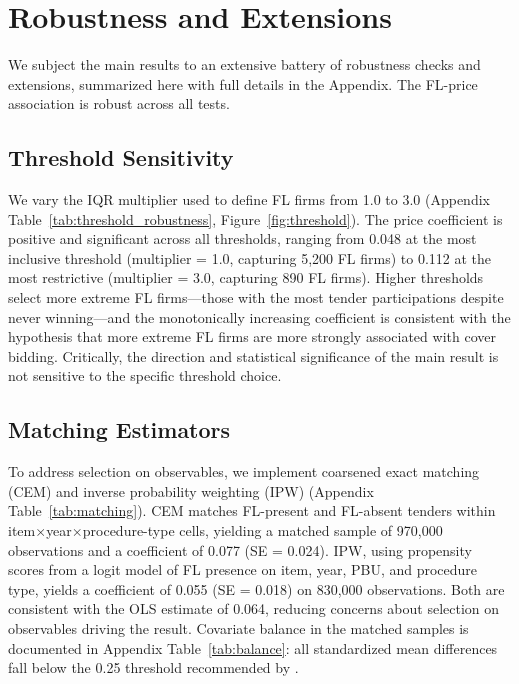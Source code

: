 \section{Robustness and Extensions}
\label{sec:robustness}

We subject the main results to an extensive battery of robustness checks and extensions, summarized here with full details in the Appendix. The FL-price association is robust across all tests.

\subsection{Threshold Sensitivity}

We vary the IQR multiplier used to define FL firms from 1.0 to 3.0 (Appendix Table~\ref{tab:threshold_robustness}, Figure~\ref{fig:threshold}). The price coefficient is positive and significant across all thresholds, ranging from 0.048 at the most inclusive threshold (multiplier = 1.0, capturing 5,200 FL firms) to 0.112 at the most restrictive (multiplier = 3.0, capturing 890 FL firms). Higher thresholds select more extreme FL firms---those with the most tender participations despite never winning---and the monotonically increasing coefficient is consistent with the hypothesis that more extreme FL firms are more strongly associated with cover bidding. Critically, the direction and statistical significance of the main result is not sensitive to the specific threshold choice.

\subsection{Matching Estimators}

To address selection on observables, we implement coarsened exact matching (CEM) and inverse probability weighting (IPW) (Appendix Table~\ref{tab:matching}). CEM matches FL-present and FL-absent tenders within item$\times$year$\times$procedure-type cells, yielding a matched sample of 970,000 observations and a coefficient of 0.077 (SE = 0.024). IPW, using propensity scores from a logit model of FL presence on item, year, PBU, and procedure type, yields a coefficient of 0.055 (SE = 0.018) on 830,000 observations. Both are consistent with the OLS estimate of 0.064, reducing concerns about selection on observables driving the result. Covariate balance in the matched samples is documented in Appendix Table~\ref{tab:balance}: all standardized mean differences fall below the 0.25 threshold recommended by \citet{imbens2015causal}.

